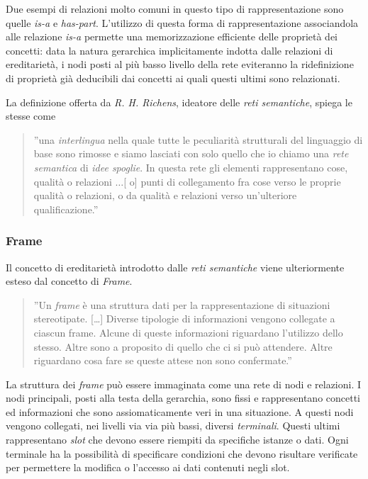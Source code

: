Due esempi di relazioni molto comuni in questo tipo di rappresentazione sono quelle  \emph{is-a} e \emph{has-part}. 
L'utilizzo di questa forma di rappresentazione associandola alle relazione \emph{is-a} permette una memorizzazione efficiente delle proprietà dei concetti: data la natura gerarchica implicitamente indotta dalle relazioni di ereditarietà, i nodi posti al più basso livello della rete eviteranno la ridefinizione di proprietà già deducibili dai concetti ai quali questi ultimi sono relazionati.

La definizione offerta da \emph{R. H. Richens}, ideatore delle \emph{reti semantiche}, spiega le stesse come
\begin{quote}
''una \emph{interlingua} nella quale tutte le peculiarità strutturali del linguaggio di base sono rimosse e siamo lasciati con solo quello che io chiamo una \emph{rete semantica} di \emph{idee spoglie}. In questa rete gli elementi rappresentano cose, qualità o relazioni $\dots$[ o] punti di collegamento fra cose verso le proprie qualità o relazioni, o da qualità e relazioni verso un'ulteriore qualificazione.'' \cite{richens1956}
\end{quote}

\subsubsection{Frame}
Il concetto di ereditarietà introdotto dalle \emph{reti semantiche} viene ulteriormente esteso dal concetto di \emph{Frame}. 
\begin{quote}
''Un \emph{frame} è una struttura dati per la rappresentazione di situazioni stereotipate. [\dots] Diverse tipologie di informazioni vengono collegate a ciascun frame. Alcune di queste informazioni riguardano l'utilizzo dello stesso. Altre sono a proposito di quello che ci si può attendere. Altre riguardano cosa fare se queste attese non sono confermate.'' \cite{minsky1974}
\end{quote}

La struttura dei \emph{frame} può essere immaginata come una rete di nodi e relazioni. I nodi principali, posti alla testa della gerarchia, sono fissi e rappresentano concetti ed informazioni che sono assiomaticamente veri in una situazione. A questi nodi vengono collegati, nei livelli via via più bassi, diversi \emph{terminali}. Questi ultimi rappresentano \emph{slot} che devono essere riempiti da specifiche istanze o dati. Ogni terminale ha la possibilità di specificare condizioni che devono risultare verificate per permettere la modifica o l'accesso ai dati contenuti negli slot. 

